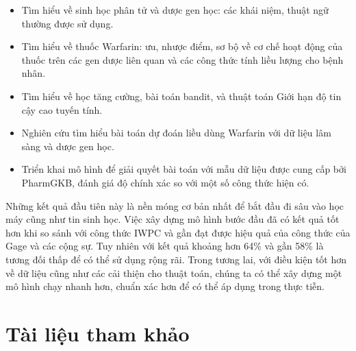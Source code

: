 \documentclass[14pt,oneside]{scrbook}
\providecommand{\tightlist}{\setlength{\itemsep}{\smallskipamount}\setlength{\parskip}{\smallskipamount}}
\begin{document}
\begin{itemize}
\tightlist
\item
  Tìm hiểu về sinh học phân tử và dược gen học: các khái niệm, thuật ngữ
  thường được sử dụng.
\item
  Tìm hiểu về thuốc Warfarin: ưu, nhược điểm, sơ bộ về cơ chế hoạt động
  của thuốc trên các gen dược liên quan và các công thức tính liều lượng
  cho bệnh nhân.
\item
  Tìm hiểu về học tăng cường, bài toán bandit, và thuật toán Giới hạn độ
  tin cậy cao tuyến tính.
\item
  Nghiên cứu tìm hiểu bài toán dự đoán liều dùng Warfarin với dữ liệu
  lâm sàng và dược gen học.
\item
  Triển khai mô hình để giải quyết bài toán với mẫu dữ liệu được cung
  cấp bởi PharmGKB, đánh giá độ chính xác so với một số công thức hiện
  có.
\end{itemize}

Những kết quả đầu tiên này là nền móng cơ bản nhất để bắt đầu đi sâu vào
học máy cũng như tin sinh học. Việc xây dựng mô hình bước đầu đã có kết
quả tốt hơn khi so sánh với công thức IWPC và gần đạt được hiệu quả của
công thức của Gage và các cộng sự. Tuy nhiên với kết quả khoảng hơn 64\%
và gần 58\% là tương đối thấp để có thể sử dụng rộng rãi. Trong tương
lai, với điều kiện tốt hơn về dữ liệu cũng như các cải thiện cho thuật
toán, chúng ta có thể xây dựng một mô hình chạy nhanh hơn, chuẩn xác hơn
để có thể áp dụng trong thực tiễn.

\chapter*{Tài liệu tham khảo}\label{tuxe0i-liux1ec7u-tham-khux1ea3o}

\end{document}
